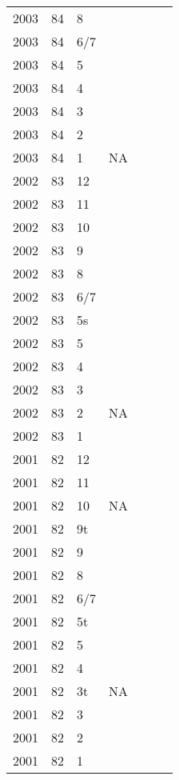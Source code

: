 \begin{longtable}{ |l|l|l|l|p{2.7cm}|l|p{2cm}| }
 2003 & 84 &     8 &         &  &  & \\
 2003 & 84 &   6/7 &         &  &  & \\
 2003 & 84 &     5 &         &  &  & \\
 2003 & 84 &     4 &         &  &  & \\
 2003 & 84 &     3 &         &  &  & \\
 2003 & 84 &     2 &         &  &  & \\
 2003 & 84 &     1 &     NA  &  &  & \\
 2002 & 83 &    12 &         &  &  & \\
 2002 & 83 &    11 &         &  &  & \\
 2002 & 83 &    10 &         &  &  & \\
 2002 & 83 &     9 &         &  &  & \\
 2002 & 83 &     8 &         &  &  & \\
 2002 & 83 &   6/7 &         &  &  & \\
 2002 & 83 &    5s &         &  &  & \\
 2002 & 83 &     5 &         &  &  & \\
 2002 & 83 &     4 &         &  &  & \\
 2002 & 83 &     3 &         &  &  & \\
 2002 & 83 &     2 &    NA   &  &  & \\
 2002 & 83 &     1 &         &  &  & \\
 2001 & 82 &    12 &         &  &  & \\
 2001 & 82 &    11 &         &  &  & \\
 2001 & 82 &    10 &      NA &  &  & \\
 2001 & 82 &    9t &         &  &  & \\
 2001 & 82 &     9 &         &  &  & \\
 2001 & 82 &     8 &         &  &  & \\
 2001 & 82 &   6/7 &         &  &  & \\
 2001 & 82 &    5t &         &  &  & \\
 2001 & 82 &     5 &         &  &  & \\
 2001 & 82 &     4 &         &  &  & \\
 2001 & 82 &    3t &     NA  &  &  & \\
 2001 & 82 &     3 &         &  &  & \\
 2001 & 82 &     2 &         &  &  & \\
 2001 & 82 &     1 &         &  &  & \\

\end{longtable}
